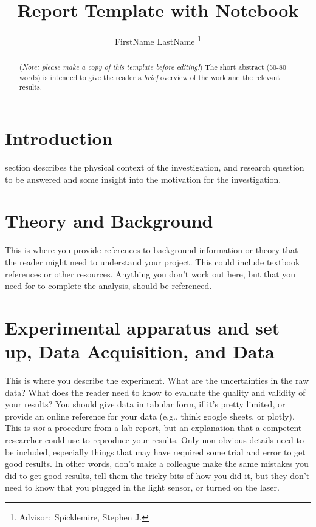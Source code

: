 \documentclass[journal, a4paper]{IEEEtran}
\begin{document}
	\title{Report Template with Notebook}
	\author{FirstName LastName
	\thanks{Advisor:~Spicklemire, Stephen J.}}
	\maketitle

\begin{abstract}
(\textit{Note: please make a copy of this template before editing!}) The short abstract (50-80 words) is intended to give the reader a {\it brief} overview of the work and the relevant results. 
\end{abstract}

\section{Introduction}
	 section describes the physical context of the investigation, and research question to be answered and some insight into the motivation for the investigation.
\section{Theory and Background}
	This is where you provide references to background information or theory that the reader might need to understand your project. This could include textbook references or other
    resources. Anything you don't work out here, but that you need for to complete
    the analysis, should be referenced.

\section{Experimental apparatus and set up, Data Acquisition, and Data}
	This is where you describe the experiment. What are the uncertainties in the raw data? What does the reader need to know to evaluate the quality and validity of your results? 
	You should give data in tabular form, if it's pretty limited, or 
    provide an online reference for your data (e.g., think google sheets, or plotly).
    This is {\it not} a procedure from a lab report, but an explanation that a
    competent researcher could use to reproduce your results. Only non-obvious details
    need to be included, especially things that may have required some trial and error to 
    get good results. In other words, don't make a colleague make the same mistakes
    you did to get good results, tell them the tricky bits of how you did it, but 
    they don't need to know that you plugged in the light sensor, or turned on the laser.
    
\end{document}
